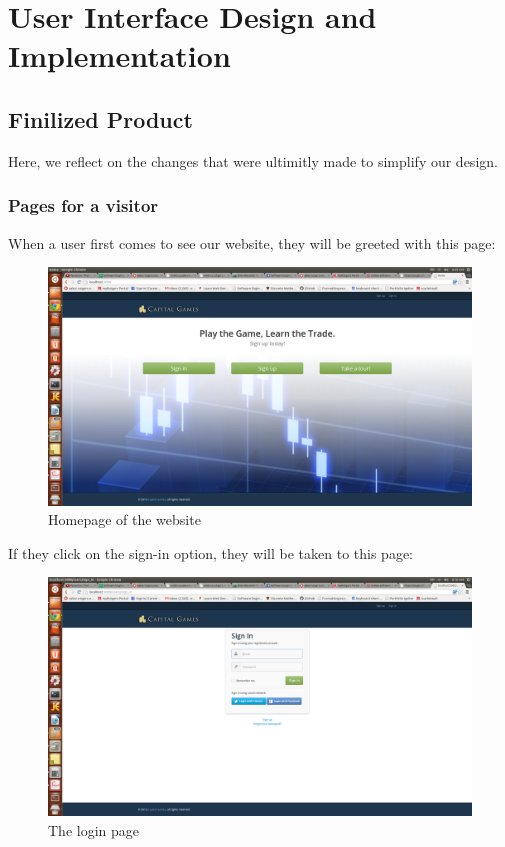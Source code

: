 \chapter{User Interface Design and Implementation}
\section{Finilized Product}
Here, we reflect on the changes that were ultimitly made to simplify our design.
\subsection{Pages for a visitor}
When a user first comes to see our website, they will be greeted with this page:
\begin{figure}[H]
\centering
\includegraphics[width=5.5in]{./img/finalDesign/homepage.png}
\caption{Homepage of the website}
\end{figure}
If they click on the sign-in option, they will be taken to this page:
\begin{figure}[H]
\centering
\includegraphics[width=5.5in]{./img/finalDesign/login.png}
\caption{The login page}
\end{figure}
